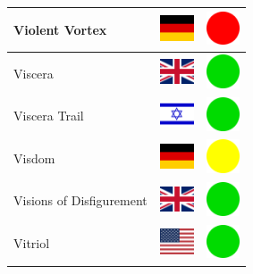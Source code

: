 \documentclass[12pt, a4paper, twoside]{report}
\begin{document}
\begin{center}
\begin{longtable}{|p{5cm}|p{2cm}|p{2cm}|}
 Violent Vortex                                             & \includegraphics[width=1cm]{../img/flags/de} &   \includegraphics[width=1cm]{../likes/n} \\ \hline
 Viscera                                                    & \includegraphics[width=1cm]{../img/flags/gb} &   \includegraphics[width=1cm]{../likes/y} \\ \hline
 Viscera Trail                                              & \includegraphics[width=1cm]{../img/flags/il} &   \includegraphics[width=1cm]{../likes/y} \\ \hline
 Visdom                                                     & \includegraphics[width=1cm]{../img/flags/de} &   \includegraphics[width=1cm]{../likes/m} \\ \hline
 Visions of Disfigurement                                   & \includegraphics[width=1cm]{../img/flags/gb} &   \includegraphics[width=1cm]{../likes/y} \\ \hline
 Vitriol                                                    & \includegraphics[width=1cm]{../img/flags/us} &   \includegraphics[width=1cm]{../likes/y} \\ \hline

\end{longtable}
\end{center}
\end{document}
